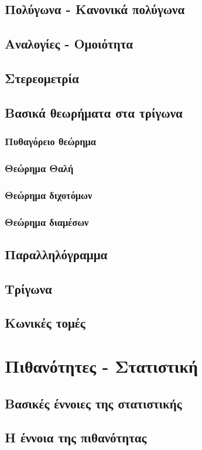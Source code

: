 \documentclass[a4paper,twoside,11pt]{book}
\begin{document}
\chapter{Πολύγωνα - Κανονικά πολύγωνα}
\chapter{Αναλογίες - Ομοιότητα}
\chapter{Στερεομετρία}
\chapter{Βασικά θεωρήματα στα τρίγωνα}
\section{Πυθαγόρειο θεώρημα}
\section{Θεώρημα Θαλή}
\section{Θεώρημα διχοτόμων}
\section{Θεώρημα διαμέσων}
\chapter{Παραλληλόγραμμα}
\chapter{Τρίγωνα}
\chapter{Κωνικές τομές}

\part{Πιθανότητες - Στατιστική}
\chapter{Βασικές έννοιες της στατιστικής}
\chapter{Η έννοια της πιθανότητας}
\end{document}
